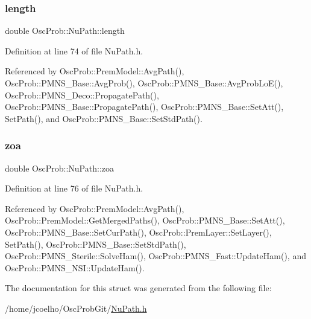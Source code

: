 \mbox{\label{structOscProb_1_1NuPath_af22660894b6e25cf835500381b155557}} 
\subsubsection{\texorpdfstring{length}{length}}
{\footnotesize\ttfamily double Osc\+Prob\+::\+Nu\+Path\+::length}



Definition at line 74 of file Nu\+Path.\+h.



Referenced by Osc\+Prob\+::\+Prem\+Model\+::\+Avg\+Path(), Osc\+Prob\+::\+P\+M\+N\+S\+\_\+\+Base\+::\+Avg\+Prob(), Osc\+Prob\+::\+P\+M\+N\+S\+\_\+\+Base\+::\+Avg\+Prob\+Lo\+E(), Osc\+Prob\+::\+P\+M\+N\+S\+\_\+\+Deco\+::\+Propagate\+Path(), Osc\+Prob\+::\+P\+M\+N\+S\+\_\+\+Base\+::\+Propagate\+Path(), Osc\+Prob\+::\+P\+M\+N\+S\+\_\+\+Base\+::\+Set\+Att(), Set\+Path(), and Osc\+Prob\+::\+P\+M\+N\+S\+\_\+\+Base\+::\+Set\+Std\+Path().

\mbox{\label{structOscProb_1_1NuPath_af3213f3691ba83c6bc05f4a3490f6b31}} 
\subsubsection{\texorpdfstring{zoa}{zoa}}
{\footnotesize\ttfamily double Osc\+Prob\+::\+Nu\+Path\+::zoa}



Definition at line 76 of file Nu\+Path.\+h.



Referenced by Osc\+Prob\+::\+Prem\+Model\+::\+Avg\+Path(), Osc\+Prob\+::\+Prem\+Model\+::\+Get\+Merged\+Paths(), Osc\+Prob\+::\+P\+M\+N\+S\+\_\+\+Base\+::\+Set\+Att(), Osc\+Prob\+::\+P\+M\+N\+S\+\_\+\+Base\+::\+Set\+Cur\+Path(), Osc\+Prob\+::\+Prem\+Layer\+::\+Set\+Layer(), Set\+Path(), Osc\+Prob\+::\+P\+M\+N\+S\+\_\+\+Base\+::\+Set\+Std\+Path(), Osc\+Prob\+::\+P\+M\+N\+S\+\_\+\+Sterile\+::\+Solve\+Ham(), Osc\+Prob\+::\+P\+M\+N\+S\+\_\+\+Fast\+::\+Update\+Ham(), and Osc\+Prob\+::\+P\+M\+N\+S\+\_\+\+N\+S\+I\+::\+Update\+Ham().



The documentation for this struct was generated from the following file\+:\begin{DoxyCompactItemize}
\item 
/home/jcoelho/\+Osc\+Prob\+Git/\hyperlink{NuPath_8h}{Nu\+Path.\+h}\end{DoxyCompactItemize}
